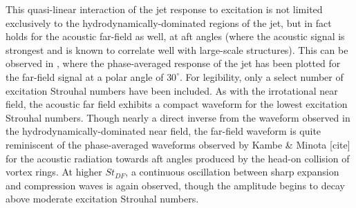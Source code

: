 This quasi-linear interaction of the jet response to excitation is not limited exclusively to the hydrodynamically-dominated regions of the jet, but in fact holds for the acoustic far-field as well, at aft angles (where the acoustic signal is strongest and is known to correlate well with large-scale structures). 
This can be observed in , where the phase-averaged response of the jet has been plotted for the far-field signal at a polar angle of $30^\circ$. 
For legibility, only a select number of excitation Strouhal numbers have been included. 
As with the irrotational near field, the acoustic far field exhibits a compact waveform for the lowest excitation Strouhal numbers. 
Though nearly a direct inverse from the waveform observed in the hydrodynamically-dominated near field, the far-field waveform is quite reminiscent of the phase-averaged waveforms observed by Kambe \& Minota [cite] for the acoustic radiation towards aft angles produced by the head-on collision of vortex rings. 
At higher $St_{DF}$, a continuous oscillation between sharp expansion and compression waves is again observed, though the amplitude begins to decay above moderate excitation Strouhal numbers. 
